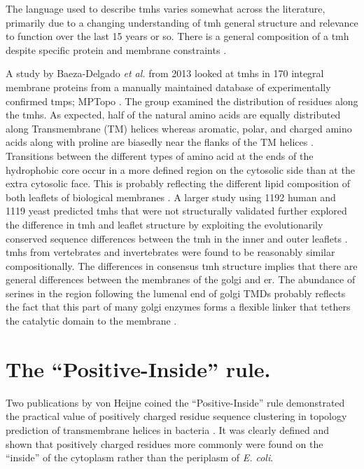 \documentclass[12pt,PhD,twoside]{muthesis}
\begin{document}
The language used to describe \gls{tmh}s varies somewhat across the literature, primarily due to a changing understanding of \gls{tmh} general structure and relevance to function over the last 15 years or so. There is a general composition of a \gls{tmh} despite specific protein and membrane constraints \cite{Sharpe2010}.

A study by Baeza-Delgado {\it et al.} from 2013 \cite{Baeza-Delgado2013} looked at \gls{tmh}s in 170 integral membrane proteins from a manually maintained database of experimentally confirmed \gls{tmp}s; MPTopo \cite{Jayasinghe2001}. The group examined the distribution of residues along the \gls{tmh}s. As expected, half of the natural amino acids are equally distributed along Transmembrane (TM) helices whereas aromatic, polar, and charged amino acids along with proline are biasedly near the flanks of the TM helices \cite{Baeza-Delgado2013}. Transitions between the different types of amino acid at the ends of the hydrophobic core occur in a more defined region on the cytosolic side than at the extra cytosolic face. This is probably reflecting the different lipid composition of both leaflets of biological membranes \cite{Baeza-Delgado2013}. A larger study using 1192 human and 1119 yeast predicted \gls{tmh}s that were not structurally validated further explored the difference in \gls{tmh} and leaflet structure by exploiting the evolutionarily conserved sequence differences between the \gls{tmh} in the inner and outer leaflets \cite{Sharpe2010}. \gls{tmh}s from vertebrates and invertebrates were found to be reasonably similar compositionally. The differences in consensus \gls{tmh} structure implies that there are general differences between the membranes of the golgi and \gls{er}. The abundance of serines in the region following the lumenal end of golgi TMDs probably reflects the fact that this part of many golgi enzymes forms a flexible linker that tethers the catalytic domain to the membrane \cite{Sharpe2010}.

\section{The ``Positive-Inside'' rule.}

Two publications by von Heijne coined the ``Positive-Inside'' rule demonstrated the practical value of positively charged residue sequence clustering in topology prediction of transmembrane helices in bacteria \cite{VonHeijne1989,VonHeijne1992}. It was clearly defined and shown that positively charged residues more commonly were found on the ``inside'' of the cytoplasm rather than the periplasm of {\it E. coli}.
\end{document}
